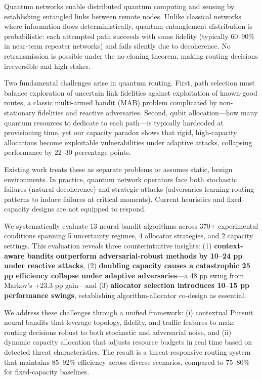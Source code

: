 \documentclass[sigconf,anonymous]{acmart}
\begin{document}
Quantum networks enable distributed quantum computing and sensing by establishing entangled links between remote nodes. Unlike classical networks where information flows deterministically, quantum entanglement distribution is probabilistic: each attempted path succeeds with some fidelity (typically 60--90\% in near-term repeater networks) and fails silently due to decoherence. No retransmission is possible under the no-cloning theorem, making routing decisions irreversible and high-stakes.

Two fundamental challenges arise in quantum routing. First, path selection must balance exploration of uncertain link fidelities against exploitation of known-good routes, a classic multi-armed bandit (MAB) problem complicated by non-stationary fidelities and reactive adversaries. Second, qubit allocation—how many quantum resources to dedicate to each path—is typically hardcoded at provisioning time, yet our capacity paradox shows that rigid, high-capacity allocations become exploitable vulnerabilities under adaptive attacks, collapsing performance by 22--30 percentage points.

Existing work treats these as separate problems or assumes static, benign environments. In practice, quantum network operators face both stochastic failures (natural decoherence) and strategic attacks (adversaries learning routing patterns to induce failures at critical moments). Current heuristics and fixed-capacity designs are not equipped to respond.

We systematically evaluate 13 neural bandit algorithms across 370+ experimental conditions spanning 5 uncertainty regimes, 4 allocator strategies, and 2 capacity settings. This evaluation reveals three counterintuitive insights: (1) \textbf{context-aware bandits outperform adversarial-robust methods by 10--24 pp under reactive attacks}, (2) \textbf{doubling capacity causes a catastrophic 25 pp efficiency collapse under adaptive adversaries}—a 48 pp swing from Markov's +23.3 pp gain—and (3) \textbf{allocator selection introduces 10--15 pp performance swings}, establishing algorithm-allocator co-design as essential.

We address these challenges through a unified framework: (i) contextual Pursuit neural bandits that leverage topology, fidelity, and traffic features to make routing decisions robust to both stochastic and adversarial noise, and (ii) dynamic capacity allocation that adjusts resource budgets in real time based on detected threat characteristics. The result is a threat-responsive routing system that maintains 85--92\% efficiency across diverse scenarios, compared to 75--80\% for fixed-capacity baselines.
\end{document}
